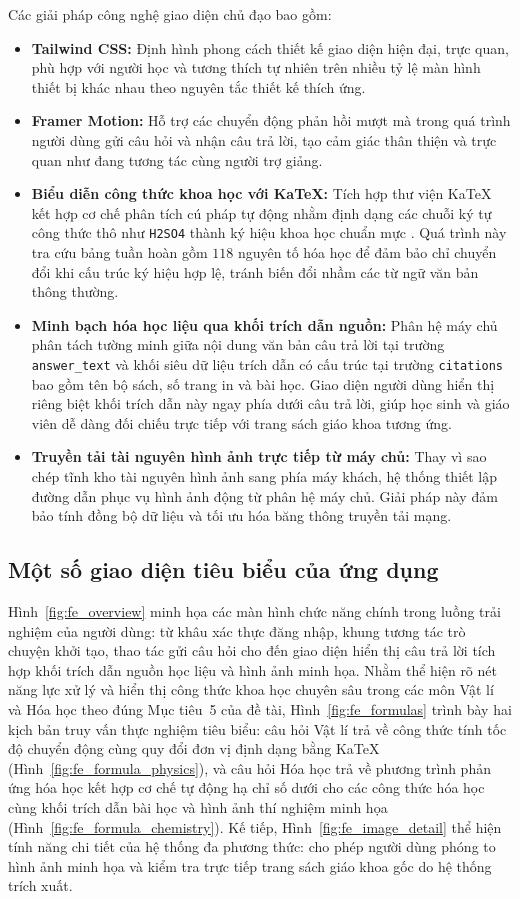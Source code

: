 Các giải pháp công nghệ giao diện chủ đạo bao gồm:
\begin{itemize}
    \item \textbf{Tailwind CSS:} Định hình phong cách thiết kế giao diện hiện đại, trực quan, phù hợp với người học và tương thích tự nhiên trên nhiều tỷ lệ màn hình thiết bị khác nhau theo nguyên tắc thiết kế thích ứng.
    \item \textbf{Framer Motion:} Hỗ trợ các chuyển động phản hồi mượt mà trong quá trình người dùng gửi câu hỏi và nhận câu trả lời, tạo cảm giác thân thiện và trực quan như đang tương tác cùng người trợ giảng.
    \item \textbf{Biểu diễn công thức khoa học với KaTeX:} Tích hợp thư viện KaTeX kết hợp cơ chế phân tích cú pháp tự động nhằm định dạng các chuỗi ký tự công thức thô như \texttt{H2SO4} thành ký hiệu khoa học chuẩn mực . Quá trình này tra cứu bảng tuần hoàn gồm $118$ nguyên tố hóa học để đảm bảo chỉ chuyển đổi khi cấu trúc ký hiệu hợp lệ, tránh biến đổi nhầm các từ ngữ văn bản thông thường.
    \item \textbf{Minh bạch hóa học liệu qua khối trích dẫn nguồn:} Phân hệ máy chủ phân tách tường minh giữa nội dung văn bản câu trả lời tại trường \texttt{answer\_text} và khối siêu dữ liệu trích dẫn có cấu trúc tại trường \texttt{citations} bao gồm tên bộ sách, số trang in và bài học. Giao diện người dùng hiển thị riêng biệt khối trích dẫn này ngay phía dưới câu trả lời, giúp học sinh và giáo viên dễ dàng đối chiếu trực tiếp với trang sách giáo khoa tương ứng.
    \item \textbf{Truyền tải tài nguyên hình ảnh trực tiếp từ máy chủ:} Thay vì sao chép tĩnh kho tài nguyên hình ảnh sang phía máy khách, hệ thống thiết lập đường dẫn phục vụ hình ảnh động từ phân hệ máy chủ. Giải pháp này đảm bảo tính đồng bộ dữ liệu và tối ưu hóa băng thông truyền tải mạng.
\end{itemize}

\subsection{Một số giao diện tiêu biểu của ứng dụng}
Hình~\ref{fig:fe_overview} minh họa các màn hình chức năng chính trong luồng trải nghiệm của người dùng: từ khâu xác thực đăng nhập, khung tương tác trò chuyện khởi tạo, thao tác gửi câu hỏi cho đến giao diện hiển thị câu trả lời tích hợp khối trích dẫn nguồn học liệu và hình ảnh minh họa. Nhằm thể hiện rõ nét năng lực xử lý và hiển thị công thức khoa học chuyên sâu trong các môn Vật lí và Hóa học theo đúng Mục tiêu~5 của đề tài, Hình~\ref{fig:fe_formulas} trình bày hai kịch bản truy vấn thực nghiệm tiêu biểu: câu hỏi Vật lí trả về công thức tính tốc độ chuyển động cùng quy đổi đơn vị định dạng bằng KaTeX (Hình~\ref{fig:fe_formula_physics}), và câu hỏi Hóa học trả về phương trình phản ứng hóa học kết hợp cơ chế tự động hạ chỉ số dưới cho các công thức hóa học cùng khối trích dẫn bài học và hình ảnh thí nghiệm minh họa (Hình~\ref{fig:fe_formula_chemistry}). Kế tiếp, Hình~\ref{fig:fe_image_detail} thể hiện tính năng chi tiết của hệ thống đa phương thức: cho phép người dùng phóng to hình ảnh minh họa và kiểm tra trực tiếp trang sách giáo khoa gốc do hệ thống trích xuất.

